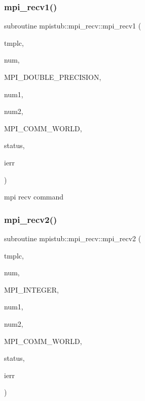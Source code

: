 \subsubsection{\texorpdfstring{mpi\_recv1()}{mpi\_recv1()}}
{\footnotesize\ttfamily subroutine mpistub\+::mpi\+\_\+recv\+::mpi\+\_\+recv1 (\begin{DoxyParamCaption}\item[{double precision}]{tmplc,  }\item[{}]{num,  }\item[{}]{M\+P\+I\+\_\+\+D\+O\+U\+B\+L\+E\+\_\+\+P\+R\+E\+C\+I\+S\+I\+ON,  }\item[{}]{num1,  }\item[{}]{num2,  }\item[{}]{M\+P\+I\+\_\+\+C\+O\+M\+M\+\_\+\+W\+O\+R\+LD,  }\item[{integer, dimension(\+:)}]{status,  }\item[{}]{ierr }\end{DoxyParamCaption})}



mpi recv command 

\mbox{\label{interfacempistub_1_1mpi__recv_a58c9fdc428722f7a4acb870279785253}} 
\subsubsection{\texorpdfstring{mpi\_recv2()}{mpi\_recv2()}}
{\footnotesize\ttfamily subroutine mpistub\+::mpi\+\_\+recv\+::mpi\+\_\+recv2 (\begin{DoxyParamCaption}\item[{integer}]{tmplc,  }\item[{}]{num,  }\item[{}]{M\+P\+I\+\_\+\+I\+N\+T\+E\+G\+ER,  }\item[{}]{num1,  }\item[{}]{num2,  }\item[{}]{M\+P\+I\+\_\+\+C\+O\+M\+M\+\_\+\+W\+O\+R\+LD,  }\item[{integer, dimension(\+:)}]{status,  }\item[{}]{ierr }\end{DoxyParamCaption})}

\mbox{\label{interfacempistub_1_1mpi__recv_afde125ef751e35a1e41b3014e63dd2e6}} 
